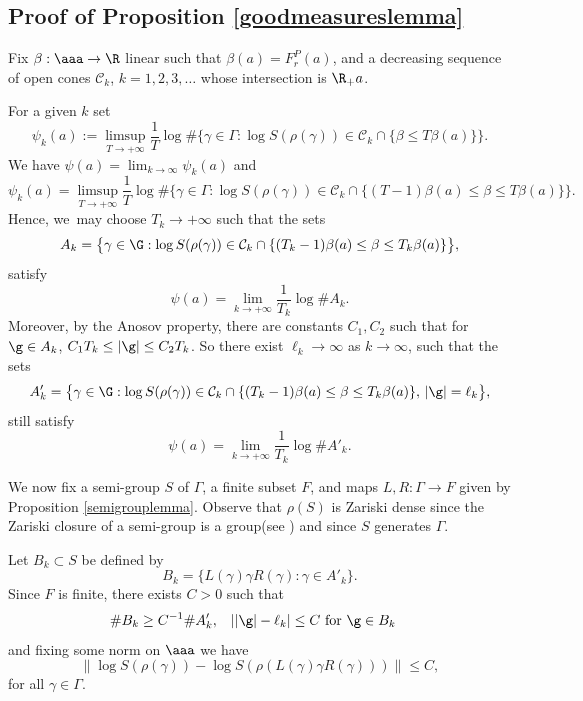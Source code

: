 \subsection{Proof of Proposition \ref{goodmeasureslemma}}

Fix \(\beta:\aaa \to \R\) linear such that \(\beta(a) = F_r^P(a)\), and a decreasing sequence of open cones \(\mathcal{C}_k\), \(k = 1,2,3,\ldots\) whose intersection is \(\R_+ a\).

For a given \(k\) set\vspace*{-3pt}
\[
\psi_k(a) := \limsup_{T \to +\infty}\frac{1}{T}\log \#\bigl\lbrace \gamma \in \Gamma: \log S(\rho(\gamma)) \in \mathcal{C}_k\cap \lbrace \beta \le T \beta(a)\rbrace \bigr\rbrace. 
\]
We have \(\psi (a) = \lim_{k \to \infty } \psi_k (a) \) and\vspace*{-3pt}
\[
\psi_k(a) = \limsup_{T \to +\infty}\frac{1}{T}\log \#\bigl\lbrace \gamma \in \Gamma: \log S(\rho(\gamma)) \in \mathcal{C}_k \cap \lbrace (T-1)\beta(a) \le \beta \le T \beta(a)\rbrace \bigr\rbrace.
\]
Hence, we~may choose \(T_k \to +\infty\) such that the sets\vspace*{-3pt}
\[
A_k = \bigl\lbrace \gamma \in \G: \log S (\rho(\gamma))\in \mathcal{C}_k \cap \lbrace (T_k-1)\beta(a) \le \beta \le T_k \beta(a)\rbrace\bigr\rbrace,
\]
satisfy\vspace*{-3pt}
\[
\psi(a) = \lim_{k \to +\infty}\frac{1}{T_k}\log \# A_k.
\]
Moreover, by the Anosov property, there are constants \(C_1,C_2\) such that for \(\g \in A_k\), \(C_1T_k \le |\g| \le C_2T_k\). So there exist \(\ell_k \to \infty \) as \(k \to \infty \), such that the sets
\[
A'_k = \bigl\lbrace \gamma \in \G: \log S (\rho(\gamma)) \in \mathcal{C}_k \cap \lbrace (T_k-1)\beta(a) \le \beta \le T_k \beta(a)\rbrace,\, |\g| = \ell_k\bigr\rbrace,
\]
still satisfy\vspace*{-3pt}
\[
\psi(a) = \lim_{k \to +\infty}\frac{1}{T_k}\log \# A'_k.
\]

We now fix a semi-group \(S\) of \(\Gamma\), a finite subset \(F\), and maps \(L,R:\Gamma \to F\) given by Proposition \ref{semigrouplemma}. Observe that \(\rho(S)\) is Zariski dense since the Zariski closure of a semi-group is a group(see \cite{goldsheid-margulis}) and since \(S\) generates \(\Gamma\).

Let \(B_k \subset S\) be defined by\vspace*{-3pt}
\[
B_k = \lbrace L(\gamma)\gamma R(\gamma): \gamma \in A'_k\rbrace.
\]
Since \(F\) is finite, there exists \(C > 0\) such that\vspace*{-3pt}
\begin{align*} \# B_k &\ge C^{-1} \# A'_k, & | |\g| - \ell_k | &\le C {\textrm { for }} \g \in B_k \end{align*}
and fixing some norm on \(\aaa\) we have\vspace*{-3pt}
\[
\|\log S(\rho(\gamma)) - \log S(\rho(L(\gamma)\gamma R(\gamma)))\| \le C,
\]
for all \(\gamma \in \Gamma\).

